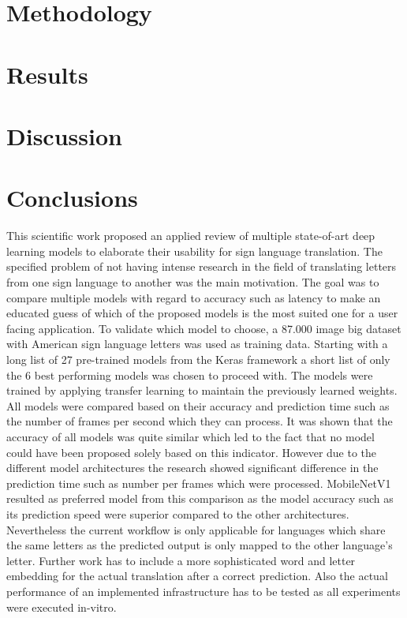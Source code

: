 \documentclass[a4paper]{article}
\begin{document}
\section{Methodology}



\section{Results}\label{chapter_results}


\section{Discussion}

\section{Conclusions}

This scientific work proposed an applied review of multiple state-of-art deep learning models to elaborate their usability for sign language translation. The specified problem of not having intense research in the field of translating letters from one sign language to another was the main motivation. The goal was to compare multiple models with regard to accuracy such as latency to make an educated guess of which of the proposed models is the most suited one for a user facing application. To validate which model to choose, a 87.000 image big dataset with American sign language letters was used as training data. Starting with a long list of 27 pre-trained models from the Keras framework a short list of only the 6 best performing models was chosen to proceed with. The models were trained by applying transfer learning to maintain the previously learned weights. All models were compared based on their accuracy and prediction time such as the number of frames per second which they can process. It was shown that the accuracy of all models was quite similar which led to the fact that no model could have been proposed solely based on this indicator. However due to the different model architectures the research showed significant difference in the prediction time such as number per frames which were processed. MobileNetV1 resulted as preferred model from this comparison as the model accuracy such as its prediction speed were superior compared to the other architectures.
Nevertheless the current workflow is only applicable for languages which share the same letters as the predicted output is only mapped to the other language's letter. Further work has to include a more sophisticated word and letter embedding for the actual translation after a correct prediction.
Also the actual performance of an implemented infrastructure has to be tested as all experiments were executed in-vitro.
\end{document}
